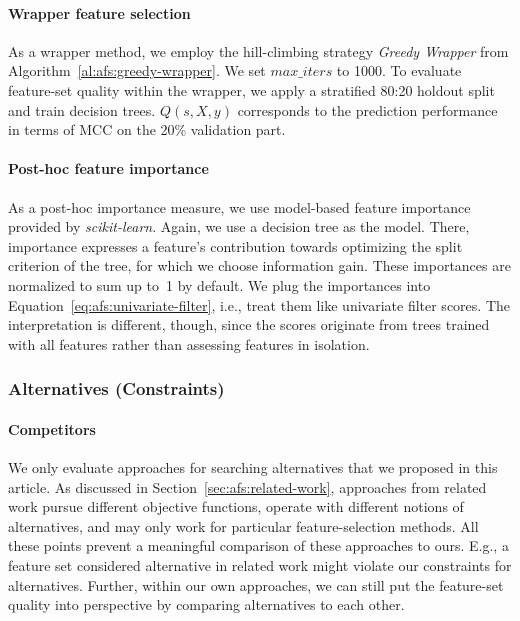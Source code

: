 \documentclass{article}
\theoremstyle{definition}
\begin{document}
\paragraph{Wrapper feature selection}

As a wrapper method, we employ the hill-climbing strategy \emph{Greedy Wrapper} from Algorithm~\ref{al:afs:greedy-wrapper}.
We set $max\_iters$ to 1000.
To evaluate feature-set quality within the wrapper, we apply a stratified 80:20 holdout split and train decision trees.
$Q(s,X,y)$ corresponds to the prediction performance in terms of MCC on the 20\% validation part.

\paragraph{Post-hoc feature importance}

As a post-hoc importance measure, we use model-based feature importance provided by \emph{scikit-learn}.
Again, we use a decision tree as the model.
There, importance expresses a feature's contribution towards optimizing the split criterion of the tree, for which we choose information gain.
These importances are normalized to sum up to~1 by default.
We plug the importances into Equation~\ref{eq:afs:univariate-filter}, i.e., treat them like univariate filter scores.
The interpretation is different, though, since the scores originate from trees trained with all features rather than assessing features in isolation.

\subsubsection{Alternatives (Constraints)}
\label{sec:afs:experimental-design:approaches:alternatives}

\paragraph{Competitors}

We only evaluate approaches for searching alternatives that we proposed in this article.
As discussed in Section~\ref{sec:afs:related-work}, approaches from related work pursue different objective functions, operate with different notions of alternatives, and may only work for particular feature-selection methods.
All these points prevent a meaningful comparison of these approaches to ours.
E.g., a feature set considered alternative in related work might violate our constraints for alternatives.
Further, within our own approaches, we can still put the feature-set quality into perspective by comparing alternatives to each other.
\end{document}
